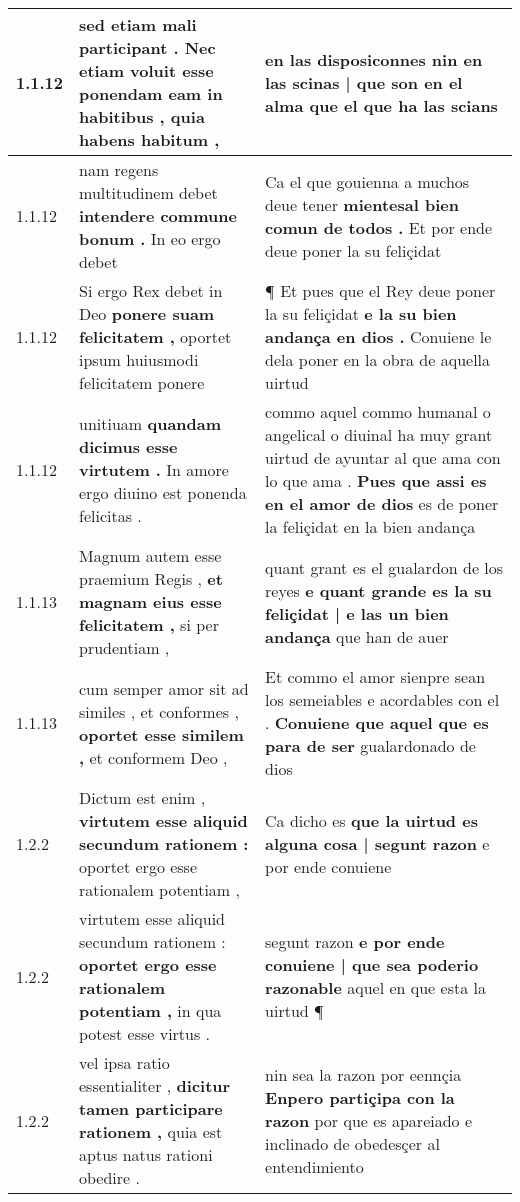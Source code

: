 \begin{tabular}{|p{1cm}|p{6.5cm}|p{6.5cm}|}
1.1.12 & sed etiam mali participant . \textbf{ Nec etiam voluit esse ponendam eam in habitibus , } quia habens habitum , & en las disposiconnes \textbf{ nin en las scinas | que son en el alma } que el que ha las scians \\\hline
1.1.12 & nam regens multitudinem debet \textbf{ intendere commune bonum . } In eo ergo debet & Ca el que gouienna a muchos deue tener \textbf{ mientesal bien comun de todos . } Et por ende deue poner la su feliçidat \\\hline
1.1.12 & Si ergo Rex debet in Deo \textbf{ ponere suam felicitatem , } oportet ipsum huiusmodi felicitatem ponere & ¶ Et pues que el Rey deue poner la su feliçidat \textbf{ e la su bien andança en dios . } Conuiene le dela poner en la obra de aquella uirtud \\\hline
1.1.12 & unitiuam \textbf{ quandam dicimus esse virtutem . } In amore ergo diuino est ponenda felicitas . & commo aquel commo humanal o angelical o diuinal ha muy grant uirtud de ayuntar al que ama con lo que ama . \textbf{ Pues que assi es en el amor de dios } es de poner la feliçidat en la bien andança \\\hline
1.1.13 & Magnum autem esse praemium Regis , \textbf{ et magnam eius esse felicitatem , } si per prudentiam , & quant grant es el gualardon de los reyes \textbf{ e quant grande es la su feliçidat | e las un bien andança } que han de auer \\\hline
1.1.13 & cum semper amor sit ad similes , et conformes , \textbf{ oportet esse similem , } et conformem Deo , & Et commo el amor sienpre sean los semeiables e acordables con el . \textbf{ Conuiene que aquel que es para de ser } gualardonado de dios \\\hline
1.2.2 & Dictum est enim , \textbf{ virtutem esse aliquid secundum rationem : } oportet ergo esse rationalem potentiam , & Ca dicho es \textbf{ que la uirtud es alguna cosa | segunt razon } e por ende conuiene \\\hline
1.2.2 & virtutem esse aliquid secundum rationem : \textbf{ oportet ergo esse rationalem potentiam , } in qua potest esse virtus . & segunt razon \textbf{ e por ende conuiene | que sea poderio razonable } aquel en que esta la uirtud ¶ \\\hline
1.2.2 & vel ipsa ratio essentialiter , \textbf{ dicitur tamen participare rationem , } quia est aptus natus rationi obedire . & nin sea la razon por eennçia \textbf{ Enpero partiçipa con la razon } por que es apareiado e inclinado de obedesçer al entendimiento \\\hline

\end{tabular}

